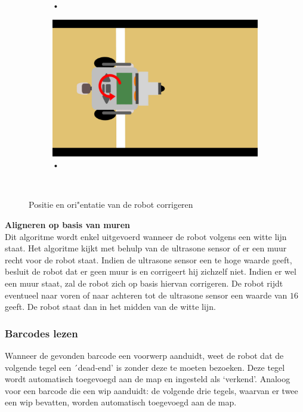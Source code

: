 \documentclass[tt3]{penoverslag}
\begin{document}
\begin{description}
\begin{figure}
\begin{subfigure}[h]{0.24\textwidth}
		\caption{•}
		\label{fig:AlgoWit6}
	\end{subfigure}
	\begin{subfigure}[h]{0.24\textwidth}
		\includegraphics[width=\textwidth]{WitteLijn7}
		\caption{•}
		\label{fig:AlgoWit7}
	\end{subfigure}\\
	\caption{Positie en ori"entatie van de robot corrigeren}
	\label{fig:AlgoWit}
\end{figure}

\item \textbf{Aligneren op basis van muren}\\
Dit algoritme wordt enkel uitgevoerd wanneer de robot volgens een witte lijn staat. Het algoritme kijkt met behulp van de ultrasone sensor of er een muur recht voor de robot staat. Indien de ultrasone sensor een te hoge waarde geeft, besluit de robot dat er geen muur is en corrigeert hij zichzelf niet. Indien er wel een muur staat, zal de robot zich op basis hiervan corrigeren. De robot rijdt eventueel naar voren of naar achteren tot de ultrasone sensor een waarde van $16$ geeft. De robot staat dan in het midden van de witte lijn.

\end{description}


\subsubsection{Barcodes lezen}
\label{ssec:AlgoBar}

Wanneer de gevonden barcode een voorwerp aanduidt, weet de robot dat de volgende tegel een ´dead-end' is zonder deze te moeten bezoeken. Deze tegel wordt automatisch toegevoegd aan de map en ingesteld als `verkend'.
Analoog voor een barcode die een wip aanduidt: de volgende drie tegels, waarvan er twee een wip bevatten, worden automatisch toegevoegd aan de map.
\end{document}
